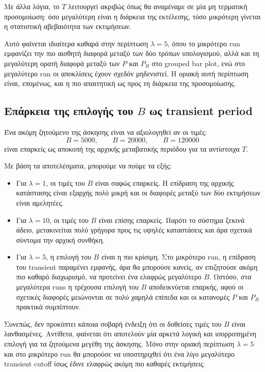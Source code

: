 \documentclass{article}
\begin{document}
Με άλλα λόγια, το $T$ λειτουργεί ακριβώς όπως θα αναμέναμε σε μία μη τερματική προσομοίωση: όσο μεγαλύτερη είναι η διάρκεια της εκτέλεσης, τόσο μικρότερη γίνεται η στατιστική αβεβαιότητα των εκτιμήσεων.

Αυτό φαίνεται ιδιαίτερα καθαρά στην περίπτωση $\lambda=5$, όπου το μικρότερο run εμφανίζει την πιο αισθητή διαφορά μεταξύ των δύο τρόπων υπολογισμού, αλλά και τη μεγαλύτερη ορατή διαφορά μεταξύ των $P$ και $P_B$ στο grouped bar plot, ενώ στο μεγαλύτερο run οι αποκλίσεις έχουν σχεδόν μηδενιστεί. Η οριακή αυτή περίπτωση είναι, επομένως, και η πιο απαιτητική ως προς τη διάρκεια της προσομοίωσης.

\subsection{Επάρκεια της επιλογής του $B$ ως transient period}

Ένα ακόμη ζητούμενο της άσκησης είναι να αξιολογηθεί αν οι τιμές:
\[
B=5000,\qquad B=20000,\qquad B=120000
\]
είναι επαρκείς ως αποκοπή της αρχικής μεταβατικής περιόδου για τα αντίστοιχα $T$.

Με βάση τα αποτελέσματα, μπορούμε να πούμε τα εξής:

\begin{itemize}
    \item Για $\lambda=1$, οι τιμές του $B$ είναι σαφώς επαρκείς. Η επίδραση της αρχικής κατάστασης είναι εξαρχής πολύ μικρή και οι διαφορές μεταξύ των δύο εκτιμήσεων είναι αμελητέες.
    \item Για $\lambda=10$, οι τιμές του $B$ είναι επίσης επαρκείς. Παρότι το σύστημα ξεκινά άδειο, μετακινείται πολύ γρήγορα προς τις υψηλές καταστάσεις και άρα  σχετικά σύντομα την αρχική συνθήκη.
    \item Για $\lambda=5$, η επιλογή του $B$ είναι η πιο κρίσιμη. Στο μικρότερο run, η επίδραση του transient παραμένει εμφανής, άρα θα μπορούσε κανείς, αν επιζητούσε ακόμη πιο καθαρό διαχωρισμό, να προτείνει ένα ελαφρώς μεγαλύτερο $B$. Ωστόσο, στα μεγαλύτερα runs η τρέχουσα επιλογή του $B$ αποδεικνύεται επαρκής, αφού οι σχετικές διαφορές μειώνονται σε πολύ χαμηλά επίπεδα και οι κατανομές $P$ και $P_B$ πρακτικά συμπίπτουν.
\end{itemize}

Συνεπώς, δεν προκύπτει κάποια σοβαρή ένδειξη ότι οι δοθείσες τιμές του $B$ είναι λανθασμένες. Αντίθετα, φαίνεται ότι αποτελούν μία αρκετά λογική και ισορροπημένη επιλογή για τα ζητούμενα μεγέθη της άσκησης. Μόνο στην οριακή περίπτωση $\lambda=5$ και στο μικρότερο run θα μπορούσε να υποστηριχθεί ότι ένα λίγο μεγαλύτερο transient cutoff ίσως έδινε ελαφρώς ακόμη πιο καθαρές εκτιμήσεις.
\end{document}
